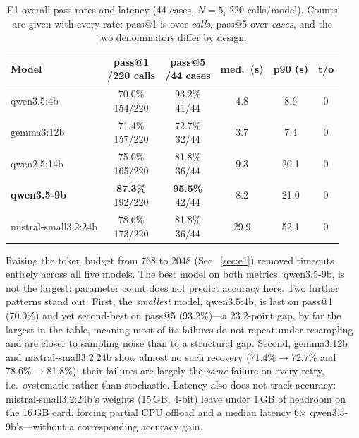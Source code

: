 \documentclass[10pt,twocolumn]{article}
\begin{document}
\begin{table}[t]
\centering\footnotesize
\caption{E1 overall pass rates and latency (44 cases, $N{=}5$, 220 calls/model).
Counts are given with every rate: pass@1 is over \emph{calls}, pass@5 over
\emph{cases}, and the two denominators differ by design.}
\label{tab:e1-summary}
\setlength{\tabcolsep}{3pt}
\begin{tabular}{lccccc}
\toprule
Model & \makecell{pass@1\\\scriptsize /220 calls} & \makecell{pass@5\\\scriptsize /44 cases} & med.\ (s) & p90 (s) & t/o \\
\midrule
qwen3.5:4b          & \makecell{70.0\%\\\scriptsize 154/220} & \makecell{93.2\%\\\scriptsize 41/44} &  4.8 &  8.6 & 0 \\
gemma3:12b           & \makecell{71.4\%\\\scriptsize 157/220} & \makecell{72.7\%\\\scriptsize 32/44} &  3.7 &  7.4 & 0 \\
qwen2.5:14b          & \makecell{75.0\%\\\scriptsize 165/220} & \makecell{81.8\%\\\scriptsize 36/44} &  9.3 & 20.1 & 0 \\
\textbf{qwen3.5-9b}  & \makecell{\textbf{87.3\%}\\\scriptsize 192/220} & \makecell{\textbf{95.5\%}\\\scriptsize 42/44} &  8.2 & 21.0 & 0 \\
mistral-small3.2:24b     & \makecell{78.6\%\\\scriptsize 173/220} & \makecell{81.8\%\\\scriptsize 36/44} & 29.9 & 52.1 & 0 \\
\bottomrule
\end{tabular}
\end{table}

Raising the token budget from 768 to 2048 (Sec.~\ref{sec:e1}) removed timeouts
entirely across all five models. The best model on both metrics,
qwen3.5-9b, is not the largest: parameter count does not predict accuracy
here. Two further patterns stand out. First, the \emph{smallest} model,
qwen3.5:4b, is last on pass@1 (70.0\%) and yet second-best on pass@5
(93.2\%)---a 23.2-point gap, by far the largest in the table, meaning most of
its failures do not repeat under resampling and are closer to
sampling noise than to a structural gap. Second, gemma3:12b and
mistral-small3.2:24b show almost no such recovery (71.4\%$\to$72.7\% and
78.6\%$\to$81.8\%): their failures are largely the \emph{same} failure on
every retry, i.e.\ systematic rather than stochastic. Latency also does not
track accuracy: mistral-small3.2:24b's weights (15\,GB, 4-bit) leave under
1\,GB of headroom on the 16\,GB card, forcing partial CPU offload and a
median latency 6$\times$ qwen3.5-9b's---without a corresponding accuracy
gain.
\end{document}
